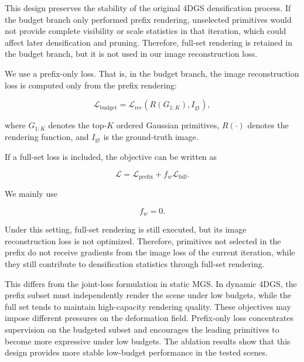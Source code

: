 \documentclass[pdflatex,sn-mathphys]{sn-jnl}
\begin{document}
This design preserves the stability of the original 4DGS densification process. If the budget branch only performed prefix rendering, unselected primitives would not provide complete visibility or scale statistics in that iteration, which could affect later densification and pruning. Therefore, full-set rendering is retained in the budget branch, but it is not used in our image reconstruction loss.

We use a prefix-only loss. That is, in the budget branch, the image reconstruction loss is computed only from the prefix rendering:

\begin{equation}
\mathcal{L}_{\mathrm{budget}}
=
\mathcal{L}_{\mathrm{rec}}(R(G_{1:K}), I_{\mathrm{gt}}),
\label{eq:budget_loss}
\end{equation}

where $G_{1:K}$ denotes the top-$K$ ordered Gaussian primitives, $R(\cdot)$ denotes the rendering function, and $I_{\mathrm{gt}}$ is the ground-truth image.

If a full-set loss is included, the objective can be written as

\begin{equation}
\mathcal{L}
=
\mathcal{L}_{\mathrm{prefix}}
+
f_w\mathcal{L}_{\mathrm{full}}.
\label{eq:full_loss}
\end{equation}

We mainly use

\begin{equation}
f_w = 0.
\label{eq:fw}
\end{equation}

Under this setting, full-set rendering is still executed, but its image reconstruction loss is not optimized. Therefore, primitives not selected in the prefix do not receive gradients from the image loss of the current iteration, while they still contribute to densification statistics through full-set rendering.

This differs from the joint-loss formulation in static MGS. In dynamic 4DGS, the prefix subset must independently render the scene under low budgets, while the full set tends to maintain high-capacity rendering quality. These objectives may impose different pressures on the deformation field. Prefix-only loss concentrates supervision on the budgeted subset and encourages the leading primitives to become more expressive under low budgets. The ablation results show that this design provides more stable low-budget performance in the tested scenes.
\end{document}
